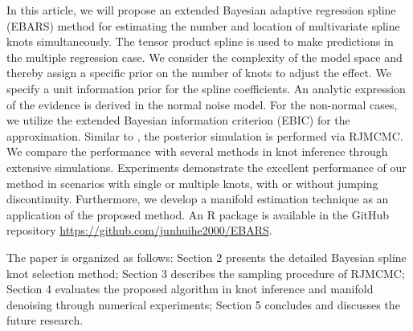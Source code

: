 In this article, we will propose an extended Bayesian adaptive regression spline (EBARS) method for estimating the number and location of multivariate spline knots simultaneously. The tensor product spline \citep{dierckx1995curve} is used to make predictions in the multiple regression case. We consider the complexity of the model space and thereby assign a specific prior on the number of knots to adjust the effect. We specify a unit information prior \citep{e447aec4-501c-3132-a415-1b260054b4a8} for the spline coefficients. An analytic expression of the evidence is derived in the normal noise model. For the non-normal cases, we utilize the extended Bayesian information criterion (EBIC) for the approximation. Similar to \citet{10.1093/biomet/88.4.1055}, the posterior simulation is performed via RJMCMC. We compare the performance with several methods in knot inference through extensive simulations. Experiments demonstrate the excellent performance of our method in scenarios with single or multiple knots, with or without jumping discontinuity. Furthermore, we develop a manifold estimation technique as an application of the proposed method. An R package is available in the GitHub repository \url{https://github.com/junhuihe2000/EBARS}.

The paper is organized as follows: Section 2 presents the detailed Bayesian spline knot selection method; Section 3 describes the sampling procedure of RJMCMC; Section 4 evaluates the proposed algorithm in knot inference and manifold denoising through numerical experiments; Section 5 concludes and discusses the future research.